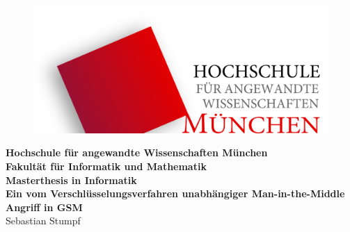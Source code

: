 \begin{center}
	\bigskip \bigskip \bigskip 
	\begin{figure}[ht]
	\centering \includegraphics[width=0.8\linewidth]{figures/hm_logo_svg.pdf}
	\end{figure}
	\vspace*{0.8cm}
	\huge \textbf{Hochschule für angewandte Wissenschaften München} \\
	\bigskip \bigskip \bigskip
	{\huge \textbf{Fakultät für Informatik und Mathematik}} \\
	\bigskip \bigskip \bigskip 
	{\Large \textbf{Masterthesis in Informatik}} \\
	\bigskip \bigskip \bigskip \bigskip \bigskip
	{\Huge \textbf{Ein vom Verschlüsselungsverfahren unabhängiger Man-in-the-Middle Angriff in GSM}} \\  
	\bigskip \bigskip \bigskip
	{\Large Sebastian Stumpf} \\
\end{center}
\vfill